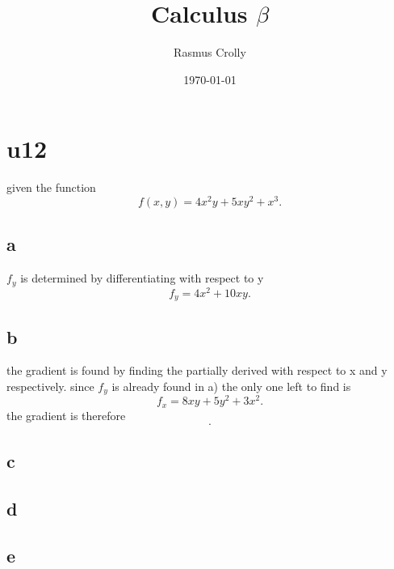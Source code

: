 \documentclass[12pt,a4paper]{article}
\title{Calculus $\beta$}
\author{Rasmus Crolly}
\date{\today}
\begin{document}
\maketitle
	
\section{u12}

given the function \[
	f\left( x,y \right) = 4x^2y+5xy^2+x^3
.\] 

\subsection{a}


$f_{y}$ is determined by differentiating with respect to y \[
f_{y}=4x^2+10xy
.\] 

\subsection{b}
the gradient is found by finding the partially derived with respect to x and y respectively. since $f_{y}$ is already found in a) the only one left to find is \[
f_{x}=8xy+5y^2+3x^2
.\] 
the gradient is therefore \[

.\] 







\subsection{c}



\subsection{d}



\subsection{e}
\end{document}
